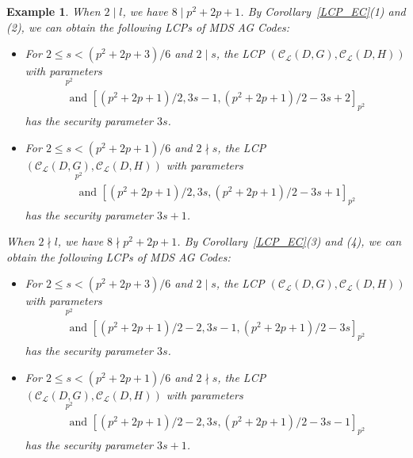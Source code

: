 \documentclass[journal,12pt,onecolumn]{IEEEtran}
\newtheorem{example}[theorem]{Example}
\begin{document}
\begin{example}
    When $2\mid l$, we have $8\mid p^2 + 2p + 1$. By Corollary~\ref{LCP_EC}(1) and (2), we can obtain the following LCPs of MDS AG Codes:
    \begin{itemize}
        \item For $2\le s <(p^2 + 2p + 3)/6$ and $2\mid s$, the LCP $(\mathcal{C}_{\mathcal{L}}(D,G),\mathcal{C}_{\mathcal{L}}(D,H))$ with parameters
        \begin{gather*}
            [(p^2 + 2p + 1)/2,(p^2 + 2p + 1)/2-3s+1,3s]_{p^2}\\
            \text{ and }[(p^2 + 2p + 1)/2,3s-1,(p^2 + 2p + 1)/2-3s+2]_{p^2}
        \end{gather*}
        has the security parameter $3s$. 
        \item For $2\le s <(p^2 + 2p + 1)/6$ and $2\nmid s$, the LCP  $(\mathcal{C}_{\mathcal{L}}(D,G),\mathcal{C}_{\mathcal{L}}(D,H))$ with parameters
        \begin{gather*}
            [(p^2 + 2p + 1)/2,(p^2 + 2p + 1)/2-3s,3s+1]_{p^2}\\
            \text{ and }[(p^2 + 2p + 1)/2,3s,(p^2 + 2p + 1)/2-3s+1]_{p^2}
        \end{gather*}
        has the security parameter $3s+1$. 
    \end{itemize}

    When $2\nmid l$, we have $8\nmid p^2 + 2p + 1$. By Corollary~\ref{LCP_EC}(3) and (4), we can obtain the following LCPs of MDS AG Codes:
    \begin{itemize}
        \item For $2\le s <(p^2 + 2p + 3)/6$ and $2\mid s$, the LCP $(\mathcal{C}_{\mathcal{L}}(D,G),\mathcal{C}_{\mathcal{L}}(D,H))$ with parameters
        \begin{gather*}
            [(p^2 + 2p + 1)/2-2,(p^2 + 2p + 1)/2-3s-1,3s]_{p^2}\\
            \text{ and }[(p^2 + 2p + 1)/2-2,3s-1,(p^2 + 2p + 1)/2-3s]_{p^2}
        \end{gather*}
        has the security parameter $3s$. 
        \item For $2\le s <(p^2 + 2p + 1)/6$ and $2\nmid s$, the LCP  $(\mathcal{C}_{\mathcal{L}}(D,G),\mathcal{C}_{\mathcal{L}}(D,H))$ with parameters
        \begin{gather*}
            [(p^2 + 2p + 1)/2-2,(p^2 + 2p + 1)/2-3s-2,3s+1]_{p^2}\\
            \text{ and }[(p^2 + 2p + 1)/2-2,3s,(p^2 + 2p + 1)/2-3s-1]_{p^2}
        \end{gather*}
        has the security parameter $3s+1$. 
    \end{itemize}


\end{example}
\end{document}
